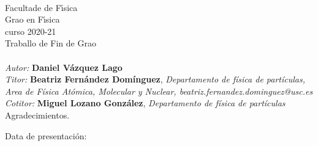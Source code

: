 \mbox{}
\mbox{}\hfill{\large \DataDefensa} \vspace{1cm}

\vfill




\clearpage
\mbox{}
\clearpage %

\mbox{}\\
Facultade de F\'{\i}sica\\
Grao en F\'{\i}sica \\  
curso 2020-21\\%
{Traballo de Fin de Grao}\vspace{3cm}\\
%
{\LARGE \TituloDoTraballo}\vspace{1cm}\\
%
{\sl Autor:} {\bf Daniel Vázquez Lago}\\ %
{\sl Titor:} {\bf Beatriz Fernández Domínguez}, {\sl Departamento de física de partículas, Area de Física Atómica, Molecular y Nuclear, beatriz.fernandez.dominguez@usc.es}\\
{\sl Cotitor:} {\bf Miguel Lozano González}, {\sl Departamento de física de partículas}\vspace{1cm}\\
%
Agradecimientos.

\mbox{}

\mbox{}\hfill{Data de presentaci\'on: \DataDefensa}


\clearpage




